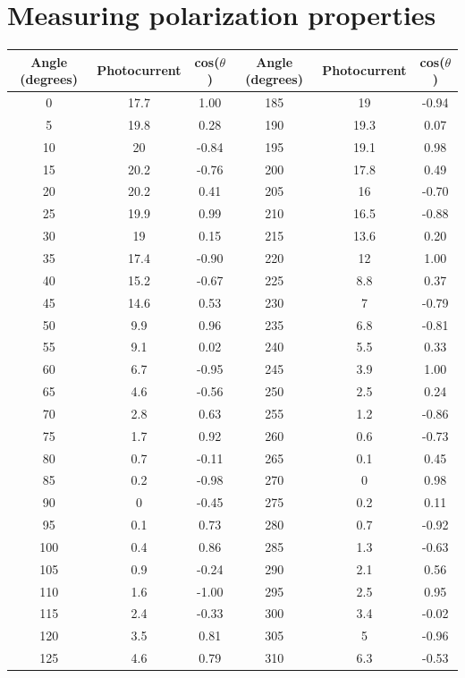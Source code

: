 \documentclass[12pt]{report}
\begin{document}
\section{Measuring polarization properties}
\begin{center}
	\begin{tabular}{ |c|c|c|c|c|c| } 
		\hline
		Angle (degrees) & Photocurrent & cos($\theta$) & Angle (degrees) & Photocurrent & cos($\theta$)\\ 
		\hline
0   & 17.7 & 1.00  & 185 & 19   & -0.94 \\
5   & 19.8 & 0.28  & 190 & 19.3 & 0.07  \\
10  & 20   & -0.84 & 195 & 19.1 & 0.98  \\
15  & 20.2 & -0.76 & 200 & 17.8 & 0.49  \\
20  & 20.2 & 0.41  & 205 & 16   & -0.70 \\
25  & 19.9 & 0.99  & 210 & 16.5 & -0.88 \\
30  & 19   & 0.15  & 215 & 13.6 & 0.20  \\
35  & 17.4 & -0.90 & 220 & 12   & 1.00  \\
40  & 15.2 & -0.67 & 225 & 8.8  & 0.37  \\
45  & 14.6 & 0.53  & 230 & 7    & -0.79 \\
50  & 9.9  & 0.96  & 235 & 6.8  & -0.81 \\
55  & 9.1  & 0.02  & 240 & 5.5  & 0.33  \\
60  & 6.7  & -0.95 & 245 & 3.9  & 1.00  \\
65  & 4.6  & -0.56 & 250 & 2.5  & 0.24  \\
70  & 2.8  & 0.63  & 255 & 1.2  & -0.86 \\
75  & 1.7  & 0.92  & 260 & 0.6  & -0.73 \\
80  & 0.7  & -0.11 & 265 & 0.1  & 0.45  \\
85  & 0.2  & -0.98 & 270 & 0    & 0.98  \\
90  & 0    & -0.45 & 275 & 0.2  & 0.11  \\
95  & 0.1  & 0.73  & 280 & 0.7  & -0.92 \\
100 & 0.4  & 0.86  & 285 & 1.3  & -0.63 \\
105 & 0.9  & -0.24 & 290 & 2.1  & 0.56  \\
110 & 1.6  & -1.00 & 295 & 2.5  & 0.95  \\
115 & 2.4  & -0.33 & 300 & 3.4  & -0.02 \\
120 & 3.5  & 0.81  & 305 & 5    & -0.96 \\
125 & 4.6  & 0.79  & 310 & 6.3  & -0.53 \\

\end{tabular}
\end{center}
\end{document}
